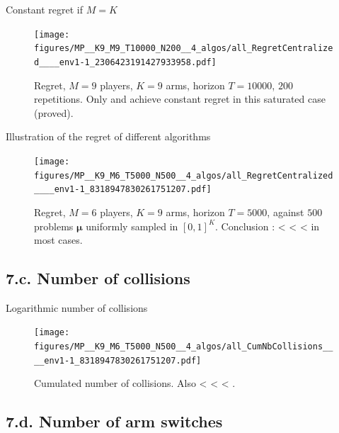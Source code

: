 \documentclass[12pt,english,ignorenonframetext,aspectratio=169,]{beamer}
\begin{document}
\begin{frame}[plain]{Constant regret if \(M=K\)}

\begin{figure}[h!]
\centering
\texttt{[image: figures/MP\_\_K9\_M9\_T10000\_N200\_\_4\_algos/all\_RegretCentralized\_\_\_\_env1-1\_2306423191427933958.pdf]}
\caption{\footnotesize{Regret, $M=9$ players, $K=9$ arms, horizon $T=10000$, $200$ repetitions. Only \textcolor{red}{\RandTopM{}} and \textcolor{yellowgreen}{\MCTopM{}} achieve constant regret in this saturated case (proved).}}
\end{figure}

\end{frame}


\begin{frame}[plain]{Illustration of the regret of different algorithms}

\begin{figure}[h!]
\centering
\texttt{[image: figures/MP\_\_K9\_M6\_T5000\_N500\_\_4\_algos/all\_RegretCentralized\_\_\_\_env1-1\_8318947830261751207.pdf]}
\caption{\footnotesize{Regret, $M=6$ players, $K=9$ arms, horizon $T=5000$, against $500$ problems $\boldsymbol{\mu}$ uniformly sampled in $[0,1]^K$. Conclusion : \textcolor{blue}{\rhoRand{}} < \textcolor{red}{\RandTopM{}} < \textcolor{bluegreen}{\Selfish{}} < \textcolor{yellowgreen}{\MCTopM{}} in most cases.}}
\end{figure}

\end{frame}


\subsection{\hfill{}7.c. Number of collisions\hfill{}}

\begin{frame}[plain]{Logarithmic number of collisions}

\begin{figure}[h!]
\centering
\texttt{[image: figures/MP\_\_K9\_M6\_T5000\_N500\_\_4\_algos/all\_CumNbCollisions\_\_\_\_env1-1\_8318947830261751207.pdf]}
\caption{\footnotesize{Cumulated number of collisions. Also \textcolor{blue}{\rhoRand{}} < \textcolor{red}{\RandTopM{}} < \textcolor{bluegreen}{\Selfish{}} < \textcolor{yellowgreen}{\MCTopM{}}.}}
\end{figure}

\end{frame}


\subsection{\hfill{}7.d. Number of arm switches\hfill{}}
\end{document}
